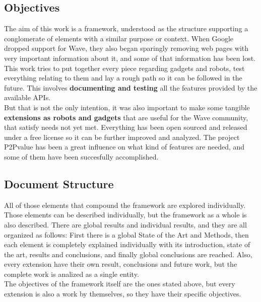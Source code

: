 \subsection{Objectives}
The aim of this work is a framework, understood as the structure supporting a conglomerate of elements with a similar purpose or context. When Google dropped support for Wave, they also began sparingly removing web pages with very important information about it, and some of that information has been lost. This work tries to put together every piece regarding gadgets and robots, test everything relating to them and lay a rough path so it can be followed in the future. This involves \textbf{documenting and testing} all the features provided by the available APIs.\\[.2cm]
But that is not the only intention, it was also important to make some tangible \textbf{extensions as robots and gadgets} that are useful for the Wave community, that satisfy needs not yet met. Everything has been open sourced and released under a free license \cite{ref:agpl} so it can be further improved and analyzed. The project P2Pvalue \cite{ref:p2pvalue} has been a great influence on what kind of features are needed, and some of them have been succesfully accomplished.

\subsection{Document Structure}
All of those elements that compound the framework are explored individually. Those elements can be described individually, but the framework as a whole is also described. There are global results and individual results, and they are all organized as follows: First there is a global State of the Art and Methods, then each element is completely explained individually with its introduction, state of the art, results and conclusions, and finally global conclusions are reached. Also, every extension have their own result, conclusions and future work, but the complete work is analized as a single entity.\\[.2cm]
The objectives of the framework itself are the ones stated above, but every extension is also a work by themselves, so they have their specific objectives.\\[.2cm]

